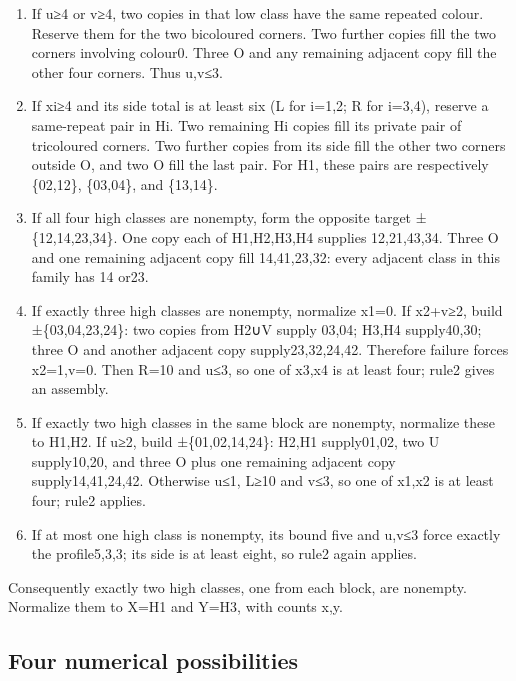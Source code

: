 \documentclass[
  10pt,
]{article}
\begin{document}
\begin{enumerate}
\def\labelenumi{\arabic{enumi}.}
\item
  If u≥4 or v≥4, two copies in that low class have the same repeated
  colour. Reserve them for the two bicoloured corners. Two further
  copies fill the two corners involving colour0. Three O and any
  remaining adjacent copy fill the other four corners. Thus u,v≤3.
\item
  If xi≥4 and its side total is at least six (L for i=1,2; R for i=3,4),
  reserve a same-repeat pair in Hi. Two remaining Hi copies fill its
  private pair of tricoloured corners. Two further copies from its side
  fill the other two corners outside O, and two O fill the last pair.
  For H1, these pairs are respectively \{02,12\}, \{03,04\}, and
  \{13,14\}.
\item
  If all four high classes are nonempty, form the opposite target
  ±\{12,14,23,34\}. One copy each of H1,H2,H3,H4 supplies 12,21,43,34.
  Three O and one remaining adjacent copy fill 14,41,23,32: every
  adjacent class in this family has 14 or23.
\item
  If exactly three high classes are nonempty, normalize x1=0. If x2+v≥2,
  build ±\{03,04,23,24\}: two copies from H2∪V supply 03,04; H3,H4
  supply40,30; three O and another adjacent copy supply23,32,24,42.
  Therefore failure forces x2=1,v=0. Then R=10 and u≤3, so one of x3,x4
  is at least four; rule2 gives an assembly.
\item
  If exactly two high classes in the same block are nonempty, normalize
  these to H1,H2. If u≥2, build ±\{01,02,14,24\}: H2,H1 supply01,02, two
  U supply10,20, and three O plus one remaining adjacent copy
  supply14,41,24,42. Otherwise u≤1, L≥10 and v≤3, so one of x1,x2 is at
  least four; rule2 applies.
\item
  If at most one high class is nonempty, its bound five and u,v≤3 force
  exactly the profile5,3,3; its side is at least eight, so rule2 again
  applies.
\end{enumerate}

Consequently exactly two high classes, one from each block, are
nonempty. Normalize them to X=H1 and Y=H3, with counts x,y.

\hypertarget{four-numerical-possibilities}{%
\subsection*{Four numerical
possibilities}\label{four-numerical-possibilities}}
\end{document}
